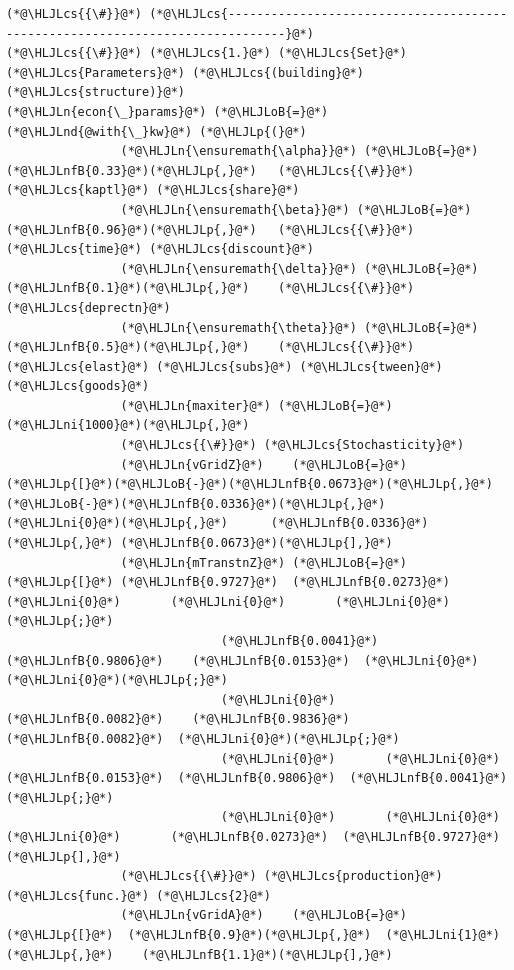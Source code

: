 \documentclass[12pt,a4paper]{article}
\newcommand{\HLJLn}[1]{#1}
\newcommand{\HLJLnd}[1]{\textcolor[RGB]{214,102,97}{#1}}
\newcommand{\HLJLnfB}[1]{\textcolor[RGB]{59,151,46}{#1}}
\newcommand{\HLJLni}[1]{\textcolor[RGB]{59,151,46}{#1}}
\newcommand{\HLJLoB}[1]{\textcolor[RGB]{102,102,102}{\textbf{#1}}}
\newcommand{\HLJLp}[1]{#1}
\newcommand{\HLJLcs}[1]{\textcolor[RGB]{153,153,119}{\textit{#1}}}
\begin{document}
\begin{lstlisting}
(*@\HLJLcs{{\#}}@*) (*@\HLJLcs{------------------------------------------------------------------------------}@*)
(*@\HLJLcs{{\#}}@*) (*@\HLJLcs{1.}@*) (*@\HLJLcs{Set}@*) (*@\HLJLcs{Parameters}@*) (*@\HLJLcs{(building}@*) (*@\HLJLcs{structure)}@*)
(*@\HLJLn{econ{\_}params}@*) (*@\HLJLoB{=}@*) (*@\HLJLnd{@with{\_}kw}@*) (*@\HLJLp{(}@*)
                (*@\HLJLn{\ensuremath{\alpha}}@*) (*@\HLJLoB{=}@*) (*@\HLJLnfB{0.33}@*)(*@\HLJLp{,}@*)   (*@\HLJLcs{{\#}}@*) (*@\HLJLcs{kaptl}@*) (*@\HLJLcs{share}@*)
                (*@\HLJLn{\ensuremath{\beta}}@*) (*@\HLJLoB{=}@*) (*@\HLJLnfB{0.96}@*)(*@\HLJLp{,}@*)   (*@\HLJLcs{{\#}}@*) (*@\HLJLcs{time}@*) (*@\HLJLcs{discount}@*)
                (*@\HLJLn{\ensuremath{\delta}}@*) (*@\HLJLoB{=}@*) (*@\HLJLnfB{0.1}@*)(*@\HLJLp{,}@*)    (*@\HLJLcs{{\#}}@*) (*@\HLJLcs{deprectn}@*)
                (*@\HLJLn{\ensuremath{\theta}}@*) (*@\HLJLoB{=}@*) (*@\HLJLnfB{0.5}@*)(*@\HLJLp{,}@*)    (*@\HLJLcs{{\#}}@*) (*@\HLJLcs{elast}@*) (*@\HLJLcs{subs}@*) (*@\HLJLcs{tween}@*) (*@\HLJLcs{goods}@*)
                (*@\HLJLn{maxiter}@*) (*@\HLJLoB{=}@*) (*@\HLJLni{1000}@*)(*@\HLJLp{,}@*)
                (*@\HLJLcs{{\#}}@*) (*@\HLJLcs{Stochasticity}@*)
                (*@\HLJLn{vGridZ}@*)    (*@\HLJLoB{=}@*) (*@\HLJLp{[}@*)(*@\HLJLoB{-}@*)(*@\HLJLnfB{0.0673}@*)(*@\HLJLp{,}@*) (*@\HLJLoB{-}@*)(*@\HLJLnfB{0.0336}@*)(*@\HLJLp{,}@*)  (*@\HLJLni{0}@*)(*@\HLJLp{,}@*)      (*@\HLJLnfB{0.0336}@*)(*@\HLJLp{,}@*) (*@\HLJLnfB{0.0673}@*)(*@\HLJLp{],}@*)
                (*@\HLJLn{mTranstnZ}@*) (*@\HLJLoB{=}@*) (*@\HLJLp{[}@*) (*@\HLJLnfB{0.9727}@*)  (*@\HLJLnfB{0.0273}@*)    (*@\HLJLni{0}@*)       (*@\HLJLni{0}@*)       (*@\HLJLni{0}@*)(*@\HLJLp{;}@*)
                              (*@\HLJLnfB{0.0041}@*)  (*@\HLJLnfB{0.9806}@*)    (*@\HLJLnfB{0.0153}@*)  (*@\HLJLni{0}@*)       (*@\HLJLni{0}@*)(*@\HLJLp{;}@*)
                              (*@\HLJLni{0}@*)       (*@\HLJLnfB{0.0082}@*)    (*@\HLJLnfB{0.9836}@*)  (*@\HLJLnfB{0.0082}@*)  (*@\HLJLni{0}@*)(*@\HLJLp{;}@*)
                              (*@\HLJLni{0}@*)       (*@\HLJLni{0}@*)         (*@\HLJLnfB{0.0153}@*)  (*@\HLJLnfB{0.9806}@*)  (*@\HLJLnfB{0.0041}@*)(*@\HLJLp{;}@*)
                              (*@\HLJLni{0}@*)       (*@\HLJLni{0}@*)         (*@\HLJLni{0}@*)       (*@\HLJLnfB{0.0273}@*)  (*@\HLJLnfB{0.9727}@*)(*@\HLJLp{],}@*)
                (*@\HLJLcs{{\#}}@*) (*@\HLJLcs{production}@*) (*@\HLJLcs{func.}@*) (*@\HLJLcs{2}@*)
                (*@\HLJLn{vGridA}@*)    (*@\HLJLoB{=}@*) (*@\HLJLp{[}@*)  (*@\HLJLnfB{0.9}@*)(*@\HLJLp{,}@*)  (*@\HLJLni{1}@*)(*@\HLJLp{,}@*)    (*@\HLJLnfB{1.1}@*)(*@\HLJLp{],}@*)

\end{lstlisting}
\end{document}
